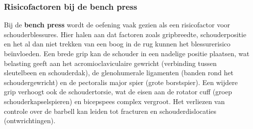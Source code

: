 \subsubsection{Risicofactoren bij de bench press}
\label{subsubsec:risicofactoren-bench-press}
Bij de \textbf{bench press} wordt de oefening vaak gezien als een risicofactor voor schouderblessures. 
Hier halen \textcite{BengtssonEtAl2018} aan dat factoren zoals gripbreedte, schouderpositie en het al dan niet trekken van een boog in de rug kunnen het blessurerisico beïnvloeden. 
Een brede grip kan de schouder in een nadelige positie plaatsen, wat belasting geeft aan het acromioclaviculaire gewricht (verbinding tussen sleutelbeen en schouderdak), de glenohumerale ligamenten (banden rond het schoudergewricht) en de pectoralis major spier (grote borstspier). 
Een wijdere grip verhoogt ook de schoudertorsie, wat de eisen aan de rotator cuff (groep schouderkapselspieren) en bicepspees complex vergroot. 
Het verliezen van controle over de barbell kan leiden tot fracturen en schouderdislocaties (ontwrichtingen).

